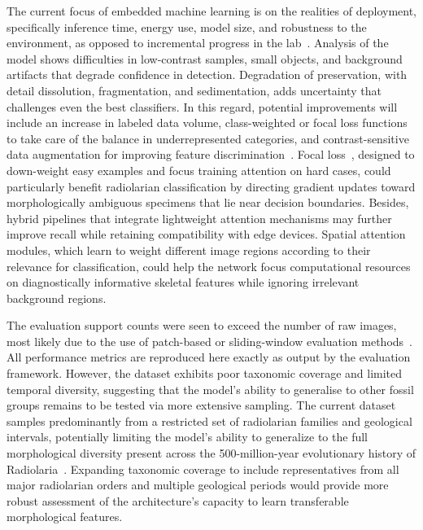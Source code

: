 \documentclass[a4paper,fleqn]{cas-sc}
\begin{document}
The current focus of embedded machine learning is on the realities of deployment, specifically inference time, energy use, model size, and robustness to the environment, as opposed to incremental progress in the lab~\cite{yaqoob2024tinyml}. Analysis of the model shows difficulties in low-contrast samples, small objects, and background artifacts that degrade confidence in detection. Degradation of preservation, with detail dissolution, fragmentation, and sedimentation, adds uncertainty that challenges even the best classifiers. In this regard, potential improvements will include an increase in labeled data volume, class-weighted or focal loss functions to take care of the balance in underrepresented categories, and contrast-sensitive data augmentation for improving feature discrimination~\cite{li2022morphology}. Focal loss~\cite{lin2017focal}, designed to down-weight easy examples and focus training attention on hard cases, could particularly benefit radiolarian classification by directing gradient updates toward morphologically ambiguous specimens that lie near decision boundaries. Besides, hybrid pipelines that integrate lightweight attention mechanisms may further improve recall while retaining compatibility with edge devices. Spatial attention modules, which learn to weight different image regions according to their relevance for classification, could help the network focus computational resources on diagnostically informative skeletal features while ignoring irrelevant background regions.~\cite{zhang2024class}

The evaluation support counts were seen to exceed the number of raw images, most likely due to the use of patch-based or sliding-window evaluation methods~\cite{liu2023patch}.  All performance metrics are reproduced here exactly as output by the evaluation framework. However, the dataset exhibits poor taxonomic coverage and limited temporal diversity, suggesting that the model's ability to generalise to other fossil groups remains to be tested via more extensive sampling. The current dataset samples predominantly from a restricted set of radiolarian families and geological intervals, potentially limiting the model's ability to generalize to the full morphological diversity present across the 500-million-year evolutionary history of Radiolaria~\cite{brombacher2020radiolarian}. Expanding taxonomic coverage to include representatives from all major radiolarian orders and multiple geological periods would provide more robust assessment of the architecture's capacity to learn transferable morphological features.
\end{document}
